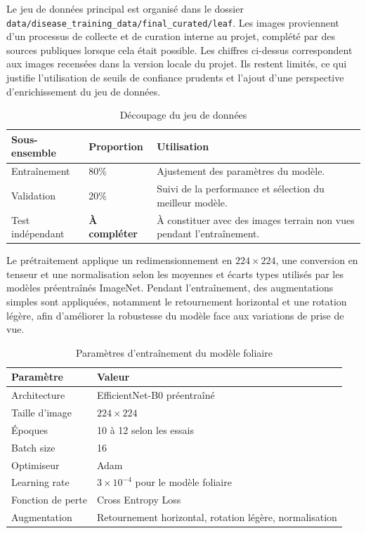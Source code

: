 \documentclass[12pt,a4paper]{report}
\begin{document}
Le jeu de données principal est organisé dans le dossier \texttt{data/disease\_training\_data/final\_curated/leaf}. Les images proviennent d'un processus de collecte et de curation interne au projet, complété par des sources publiques lorsque cela était possible. Les chiffres ci-dessus correspondent aux images recensées dans la version locale du projet. Ils restent limités, ce qui justifie l'utilisation de seuils de confiance prudents et l'ajout d'une perspective d'enrichissement du jeu de données.

\begin{table}[H]
\centering
\caption{Découpage du jeu de données}
\label{tab:split-dataset}
\begin{tabular}{|p{4cm}|p{4cm}|p{6cm}|}
\hline
\textbf{Sous-ensemble} & \textbf{Proportion} & \textbf{Utilisation} \\
\hline
Entraînement & 80\% & Ajustement des paramètres du modèle. \\
\hline
Validation & 20\% & Suivi de la performance et sélection du meilleur modèle. \\
\hline
Test indépendant & \textbf{À compléter} & À constituer avec des images terrain non vues pendant l'entraînement. \\
\hline
\end{tabular}
\end{table}

Le prétraitement applique un redimensionnement en $224 \times 224$, une conversion en tenseur et une normalisation selon les moyennes et écarts types utilisés par les modèles préentraînés ImageNet. Pendant l'entraînement, des augmentations simples sont appliquées, notamment le retournement horizontal et une rotation légère, afin d'améliorer la robustesse du modèle face aux variations de prise de vue.

\begin{table}[H]
\centering
\caption{Paramètres d'entraînement du modèle foliaire}
\label{tab:parametres-entrainement}
\begin{tabular}{|p{4cm}|p{9cm}|}
\hline
\textbf{Paramètre} & \textbf{Valeur} \\
\hline
Architecture & EfficientNet-B0 préentraîné \\
\hline
Taille d'image & $224 \times 224$ \\
\hline
Époques & 10 à 12 selon les essais \\
\hline
Batch size & 16 \\
\hline
Optimiseur & Adam \\
\hline
Learning rate & $3 \times 10^{-4}$ pour le modèle foliaire \\
\hline
Fonction de perte & Cross Entropy Loss \\
\hline
Augmentation & Retournement horizontal, rotation légère, normalisation \\
\hline
\end{tabular}
\end{table}
\end{document}
